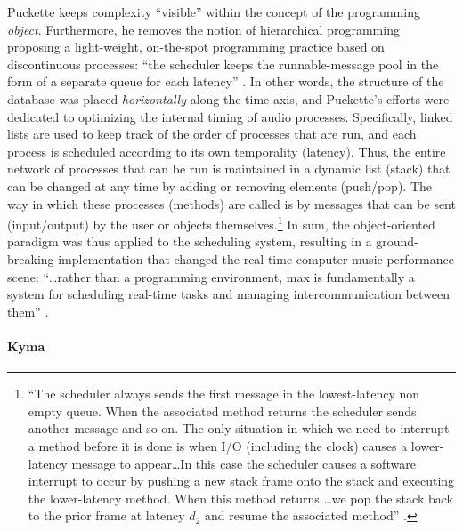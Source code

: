 Puckette keeps complexity ``visible'' within the concept of the programming \textit{object}. Furthermore, he removes the notion of hierarchical programming proposing a light-weight, on-the-spot programming practice based on discontinuous processes: ``the scheduler keeps the runnable-message pool in the form of a separate queue for each latency'' \parencite[46]{DBLP:conf/icmc/Puckette86}. In other words, the structure of the database was placed \textit{horizontally} along the time axis, and Puckette's efforts were dedicated to optimizing the internal timing of audio processes. Specifically, linked lists are used to keep track of the order of processes that are run, and each process is scheduled according to its own temporality (latency). Thus, the entire network of processes that can be run is maintained in a dynamic list (stack) that can be changed at any time by adding or removing elements (push/pop). The way in which these processes (methods) are called is by messages that can be sent (input/output) by the user or objects themselves.\footnote{``The scheduler always sends the first message in the lowest-latency non empty queue. When the associated method returns the scheduler sends another message and so on. The only situation in which we need to interrupt a method before it is done is when I/O (including the clock) causes a lower-latency message to appear\dots In this case the scheduler causes a software interrupt to occur by pushing a new stack frame onto the stack and executing the lower-latency method. When this method returns \dots we pop the stack back to the prior frame at latency \(d_2\) and resume the associated method'' \parencite[46]{DBLP:conf/icmc/Puckette86}.} In sum, the object-oriented paradigm was thus applied to the scheduling system, resulting in a ground-breaking implementation that changed the real-time computer music performance scene: ``\dots rather than a programming environment, \gls{max} is fundamentally a system for scheduling real-time tasks and managing intercommunication between them'' \parencite{DBLP:journals/comj/Puckette02}.

\paragraph{Kyma}
\label{computer:kyma}

